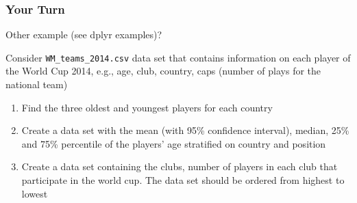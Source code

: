\documentclass[paper=screen,mathserif]{beamer}\usepackage[]{graphicx}\usepackage[]{color}
\newcommand{\ft}[1]{\frametitle{#1}}
\begin{document}
\begin{frame}[fragile]
  \ft{Your Turn}
  
  Other example (see dplyr examples)? 
  
  Consider \verb=WM_teams_2014.csv= data set that contains information
  on each player of the World Cup 2014, e.g., age, club, country, caps
  (number of plays for the national team)
  \begin{enumerate}
  \item Find the three oldest and youngest players for each country
  \item Create a data set with the mean (with 95\% confidence
    interval), median, 25\% and 75\% percentile of the players' age
    stratified on country and position
  \item Create a data set containing the clubs, number of players in
    each club that participate in the world cup. The data set should
    be ordered from highest to lowest
  \end{enumerate}
\end{frame}
\end{document}
